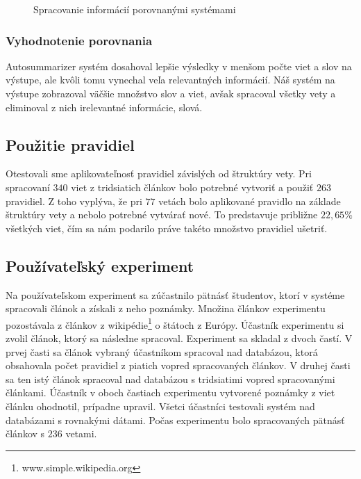 \begin{figure}[H]%
	\centering
	\qquad
	\caption{Spracovanie informácií porovnanými systémami}%
	\label{experiments:first_experiment:results:fig:processing}%
\end{figure}

\subsubsection{Vyhodnotenie porovnania}
Autosummarizer systém dosahoval lepšie výsledky v menšom počte viet a slov na výstupe, ale kvôli tomu vynechal veľa relevantných informácií. Náš systém na výstupe zobrazoval väčšie množstvo slov a viet, avšak spracoval všetky vety a eliminoval z nich irelevantné informácie, slová.

\subsection{Použitie pravidiel}
Otestovali sme aplikovateľnosť pravidiel závislých od štruktúry vety. Pri spracovaní $340$ viet z tridsiatich článkov bolo potrebné vytvoriť a použiť $263$ pravidiel. Z toho vyplýva, že pri $77$ vetách bolo aplikované pravidlo na základe štruktúry vety a nebolo potrebné vytvárať nové. To predstavuje približne $22,65\%$ všetkých viet, čím sa nám podarilo práve takéto množstvo pravidiel ušetriť.

\subsection{Používateľský experiment}
\label{experiments:main_experiment}
Na používateľskom experiment sa zúčastnilo pätnásť študentov, ktorí v systéme spracovali článok a získali z neho poznámky. Množina článkov experimentu pozostávala z článkov z wikipédie\footnote{www.simple.wikipedia.org} o štátoch z Európy. Účastník experimentu si zvolil článok, ktorý sa následne spracoval. Experiment sa skladal z dvoch častí. V prvej časti sa článok vybraný účastníkom spracoval nad databázou, ktorá obsahovala počet pravidiel z piatich vopred spracovaných článkov. V druhej časti sa ten istý článok spracoval nad databázou s tridsiatimi vopred spracovanými článkami. Účastník v oboch častiach experimentu vytvorené poznámky z viet článku ohodnotil, prípadne upravil. Všetci účastníci testovali systém nad databázami s rovnakými dátami. Počas experimentu bolo spracovaných pätnásť článkov s $236$ vetami.

